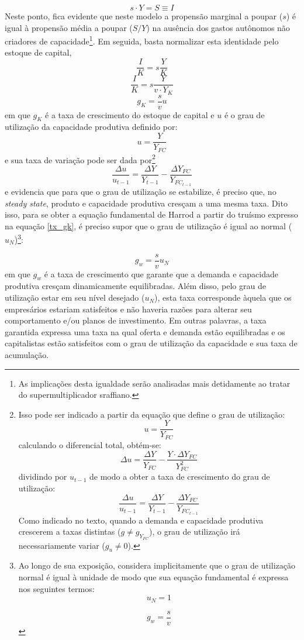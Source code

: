 $$
s\cdot Y = S \equiv I
$$
Neste ponto, fica evidente que neste modelo a propensão marginal a poupar ($s$) é igual à propensão média a poupar ($S/Y$) na ausência dos gastos autônomos não criadores de capacidade\footnote{As implicações desta igualdade serão analisadas mais detidamente ao tratar do supermultiplicador sraffiano.}. Em seguida, basta normalizar esta identidade pelo estoque de capital,
$$
\frac{I}{K} = s\frac{Y}{K}
$$
$$
\frac{I}{K} = s\frac{Y}{v\cdot Y_K}
$$
\begin{equation}
\label{tx_gk}
    g_K = \frac{s}{v}u
\end{equation}
em que $g_K$ é a taxa de crescimento do estoque de capital e $u$ é o grau de utilização da capacidade produtiva definido por:
$$
u = \frac{Y}{Y_{FC}}
$$
e sua taxa de variação pode ser dada por\footnote{Isso pode ser indicado a partir da equação que define o grau de utilização:
	$$
	u = \frac{Y}{Y_{FC}}
	$$
	calculando o diferencial total, obtém-se:
	$$
	\Delta u = \frac{\Delta Y}{ Y_{FC}} - \frac{Y\cdot \Delta Y_{FC}}{Y_{FC}^2}
	$$
	dividindo por $u_{t-1}$ de modo a obter a taxa de crescimento do grau de utilização:
	$$
	\frac{\Delta u}{u_{t-1}} = \frac{\Delta Y}{Y_{t-1}} - \frac{\Delta Y_{FC}}{Y_{FC_{t-1}}}
	$$
	Como indicado no texto, quando a demanda e capacidade produtiva crescerem a taxas distintas ($g \neq g_{Y_{FC}}$), o grau de utilização irá necessariamente variar ($g_u \neq 0$).
}
$$
\frac{\Delta u}{u_{t-1}} = \frac{\Delta Y}{Y_{t-1}} - \frac{\Delta Y_{FC}}{Y_{FC_{t-1}}}
$$
e evidencia que para que o grau de utilização se estabilize, é preciso que, no \textit{steady state}, produto e capacidade produtiva cresçam a uma mesma taxa. 
Dito isso, para se obter a equação fundamental de Harrod a partir do truísmo expresso na equação \ref{tx_gk}, é preciso supor que o grau de utilização é igual ao normal ($u_N$)\footnote{
	Ao longo de sua exposição, \textcite{harrod_essay_1939} considera implicitamente que o grau de utilização normal é igual à unidade de modo que sua equação fundamental é expressa nos seguintes termos:
	$$
	u_N = 1
	$$
	
	$$
	g_w = \frac{s}{v}
	$$
}:

\begin{equation}
    \label{Fundamental}
    g_w = \frac{s}{v}u_N
\end{equation}
em que $g_w$ é a taxa de crescimento que garante que a demanda e capacidade produtiva cresçam dinamicamente equilibradas. Além disso, pelo grau de utilização estar em seu nível desejado ($u_N$), esta taxa corresponde àquela que os empresários estariam satisfeitos e não haveria razões para alterar seu comportamento e/ou planos de investimento. Em outras palavras, a taxa garantida expressa uma taxa na qual oferta e demanda estão equilibradas e os capitalistas estão satisfeitos com o grau de utilização da capacidade e sua taxa de acumulação. 

